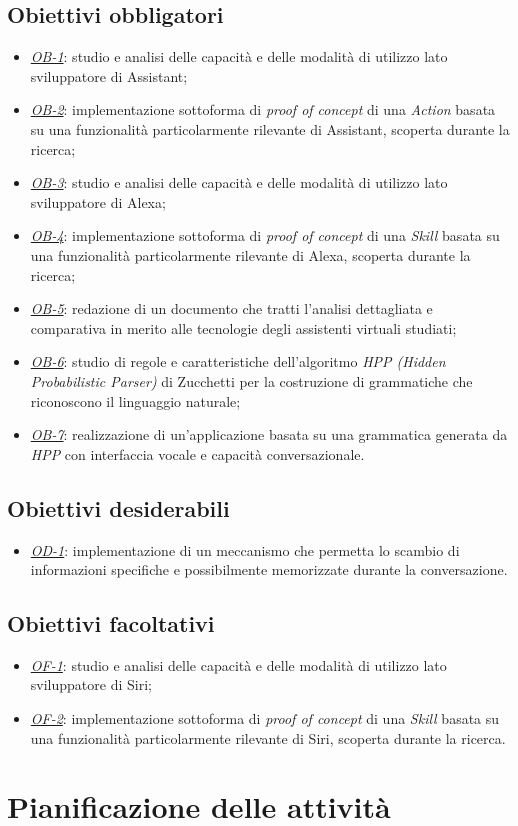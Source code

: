 \subsection{Obiettivi obbligatori}
\begin{itemize}
	\item \textit{\underline{OB-1}}: studio e analisi delle capacità e delle modalità di utilizzo lato sviluppatore di Assistant;
	\item \textit{\underline{OB-2}}: implementazione sottoforma di \textit{proof of concept} di una \textit{Action} basata su una funzionalità particolarmente rilevante di Assistant, scoperta durante la ricerca;
	\item \textit{\underline{OB-3}}: studio e analisi delle capacità e delle modalità di utilizzo lato sviluppatore di Alexa;
	\item \textit{\underline{OB-4}}: implementazione sottoforma di \textit{proof of concept} di una \textit{Skill} basata su una funzionalità particolarmente rilevante di Alexa, scoperta durante la ricerca;
	\item \textit{\underline{OB-5}}: redazione di un documento che tratti l'analisi dettagliata e comparativa in merito alle tecnologie degli assistenti virtuali studiati;
	\item \textit{\underline{OB-6}}: studio di regole e caratteristiche dell'algoritmo \textit{HPP (Hidden Probabilistic Parser)} di Zucchetti per la costruzione di grammatiche che riconoscono il linguaggio naturale;
	\item \textit{\underline{OB-7}}: realizzazione di un'applicazione basata su una grammatica generata da \textit{HPP} con interfaccia vocale e capacità conversazionale.
\end{itemize}
\subsection{Obiettivi desiderabili} 
\begin{itemize}
	\item \textit{\underline{OD-1}}: implementazione di un meccanismo che permetta lo scambio di informazioni specifiche e possibilmente memorizzate durante la conversazione.
\end{itemize}
\subsection{Obiettivi facoltativi}
\begin{itemize}
	\item \textit{\underline{OF-1}}: studio e analisi delle capacità e delle modalità di utilizzo lato sviluppatore di Siri;
	\item \textit{\underline{OF-2}}: implementazione sottoforma di \textit{proof of concept} di una \textit{Skill} basata su una funzionalità particolarmente rilevante di Siri, scoperta durante la ricerca.
\end{itemize} 


\section{Pianificazione delle attività}
